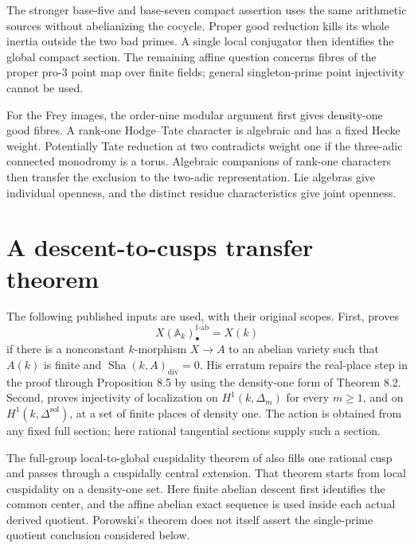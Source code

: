 \documentclass[11pt]{article}
\numberwithin{equation}{section}
\newcommand{\A}{\mathbb A}
\newcommand{\Sha}{\operatorname{Sha}}
\newcommand{\sol}{\mathrm{sol}}
\theoremstyle{definition}
\begin{document}
The stronger base-five and base-seven compact assertion uses the same
arithmetic sources without abelianizing the cocycle. Proper good reduction
kills its whole inertia outside the two bad primes. A single local
conjugator then identifies the global compact section. The remaining
affine question concerns fibres of the proper pro-$3$ point map over
finite fields; general singleton-prime point injectivity cannot be used.

For the Frey images, the order-nine modular argument first gives
density-one good fibres. A rank-one Hodge--Tate character is algebraic
and has a fixed Hecke weight. Potentially Tate reduction at two
contradicts weight one if the three-adic connected monodromy is a torus.
Algebraic companions of rank-one characters then transfer the exclusion
to the two-adic representation. Lie algebras give individual openness,
and the distinct residue characteristics give joint openness.

\begingroup
\small
\setcounter{tocdepth}{2}
\tableofcontents
\endgroup
\clearpage

\section{A descent-to-cusps transfer theorem}

The following published inputs are used, with their original scopes.
First, \citet[Theorem 8.6]{Stoll2007} proves
\begin{equation}
X(\A_k)_\bullet^{\mathrm{f\text{-}ab}}=X(k)
\label{eq:stoll}
\end{equation}
if there is a nonconstant $k$-morphism $X\to A$ to an abelian variety
such that $A(k)$ is finite and $\Sha(k,A)_{\mathrm{div}}=0$.
His erratum repairs the real-place step in the proof through
Proposition 8.5 by using the density-one form of Theorem 8.2.
Second, \citet[Proposition 3.1 and Theorem B]{Saidi2022} proves injectivity
of localization on $H^1(k,\Delta_m)$ for every $m\geq1$, and on
$H^1(k,\Delta^{\sol})$, at a set of finite places of density one.
The action is obtained from any fixed full section; here rational
tangential sections supply such a section.

The full-group local-to-global cuspidality theorem of
\citet[Theorem 2.2, pp.~3--4]{Porowski2025} also fills one rational
cusp and passes through a cuspidally central extension. That theorem
starts from local cuspidality on a density-one set. Here finite
abelian descent first identifies the common center, and the affine
abelian exact sequence is used inside each actual derived quotient.
Porowski's theorem does not itself assert the single-prime quotient
conclusion considered below.
\end{document}
